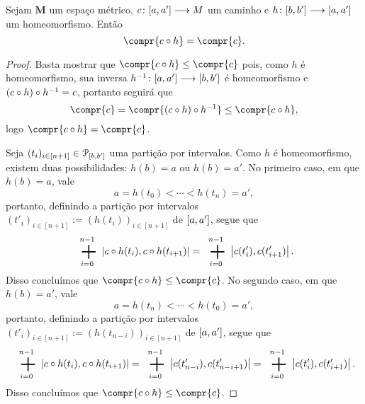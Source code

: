 \begin{proposition}
Sejam $\bm M$ um espaço métrico, ${c}\colon {\left[{a},{a'}\right]} \longrightarrow {M}$ um caminho e ${h}\colon {\left[{b},{b'}\right]} \longrightarrow {\left[{a},{a'}\right]}$ um homeomorfismo. Então
	\begin{equation*}
	\compr{c \circ h} = \compr{c}.
	\end{equation*}
\end{proposition}
\begin{proof}
Basta mostrar que $\compr{c \circ h} \leq \compr{c}$ pois, como $h$ é homeomorfismo, sua inversa ${h^{-1}}\colon {\left[{a},{a'}\right]} \longrightarrow {\left[{b},{b'}\right]}$ é homeomorfismo e $(c \circ h) \circ h^{-1} = c$, portanto seguirá que
	\begin{equation*}
	\compr{c} = \compr{(c \circ h) \circ h\inv} \leq \compr{c \circ h},
	\end{equation*}
logo $\compr{c \circ h} = \compr{c}$.

Seja $(t_i)_{i \in [n+1]} \in \mathcal{P}_{\left[{b},{b'}\right]}$ uma partição por intervalos. Como $h$ é homeomorfismo, existem duas possibilidades: $h(b)=a$ ou $h(b)=a'$. No primeiro caso, em que $h(b)=a$, vale
	\begin{equation*}
	a = h(t_0) < \cdots < h(t_n) = a',
	\end{equation*}
portanto, definindo a partição por intervalos $(t'_i)_{i \in [n+1]} := (h(t_i))_{i \in [n+1]}$ de $\left[{a},{a'}\right]$, segue que
	\begin{equation*}
	\sum_{i=0}^{n-1} \dist{c\circ h(t_i)}{c \circ h(t_{i+1})} = \sum_{i=0}^{n-1} \dist{c(t'_i)}{c(t'_{i+1})}.
	\end{equation*}
Disso concluímos que $\compr{c \circ h} \leq \compr{c}$. No segundo caso, em que $h(b)=a'$, vale
	\begin{equation*}
	a = h(t_n) < \cdots < h(t_0) = a',
	\end{equation*}
portanto, definindo a partição por intervalos $(t'_i)_{i \in [n+1]} := (h(t_{n-i}))_{i \in [n+1]}$ de $\left[{a},{a'}\right]$, segue que
	\begin{equation*}
	\sum_{i=0}^{n-1} \dist{c\circ h(t_i)}{c \circ h(t_{i+1})} = \sum_{i=0}^{n-1} \dist{c(t'_{n-i})}{c(t'_{n-i+1})} = \sum_{i=0}^{n-1} \dist{c(t'_{i})}{c(t'_{i+1})}.
	\end{equation*}
Disso concluímos que $\compr{c \circ h} \leq \compr{c}$.
\end{proof}